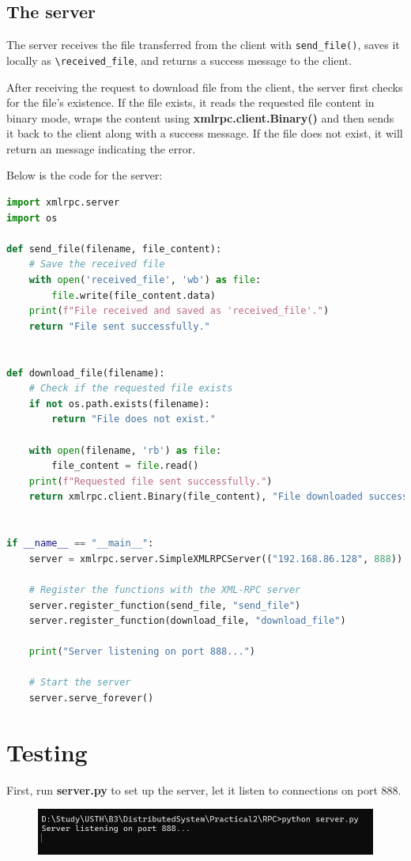 \documentclass[12pt]{article}
\begin{document}
\subsection{The server}
The server receives the file transferred from the client with \verb|send_file()|, saves it locally as \verb|\received_file|, and returns a success message to the client.

After receiving the request to download file from the client, the server first checks for the file's existence. If the file exists, it reads the requested file content in binary mode, wraps the content using \textbf{xmlrpc.client.Binary()} and then sends it back to the client along with a success message. If the file does not exist, it will return an message indicating the error.

Below is the code for the server:
\newpage
\begin{lstlisting}[language=Python]
import xmlrpc.server
import os

def send_file(filename, file_content):
    # Save the received file
    with open('received_file', 'wb') as file:
        file.write(file_content.data)
    print(f"File received and saved as 'received_file'.")
    return "File sent successfully."


def download_file(filename):
    # Check if the requested file exists
    if not os.path.exists(filename):
        return "File does not exist."

    with open(filename, 'rb') as file:
        file_content = file.read()
    print(f"Requested file sent successfully.")
    return xmlrpc.client.Binary(file_content), "File downloaded successfully."


if __name__ == "__main__":
    server = xmlrpc.server.SimpleXMLRPCServer(("192.168.86.128", 888))

    # Register the functions with the XML-RPC server
    server.register_function(send_file, "send_file")
    server.register_function(download_file, "download_file")

    print("Server listening on port 888...")

    # Start the server
    server.serve_forever()
\end{lstlisting}


\section{Testing}
First, run \textbf{server.py} to set up the server, let it listen to connections on port 888.
\begin{figure}[!ht]
\centering
\includegraphics[scale=0.5]{test-server-1.png}
\end{figure}
\end{document}
